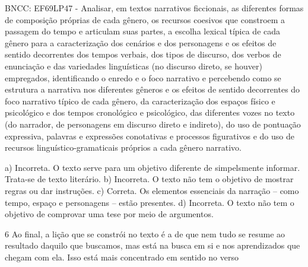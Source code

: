 \begin{escolha}
\begin{escolha}
\begin{escolha}
\begin{escolha}
\begin{escolha}
\begin{escolha}
BNCC: EF69LP47 - Analisar, em textos narrativos ficcionais, as
diferentes formas de composição próprias de cada gênero, os recursos
coesivos que constroem a passagem do tempo e articulam suas partes, a
escolha lexical típica de cada gênero para a caracterização dos cenários
e dos personagens e os efeitos de sentido decorrentes dos tempos
verbais, dos tipos de discurso, dos verbos de enunciação e das
variedades linguísticas (no discurso direto, se houver) empregados,
identificando o enredo e o foco narrativo e percebendo como se estrutura
a narrativa nos diferentes gêneros e os efeitos de sentido decorrentes
do foco narrativo típico de cada gênero, da caracterização dos espaços
físico e psicológico e dos tempos cronológico e psicológico, das
diferentes vozes no texto (do narrador, de personagens em discurso
direto e indireto), do uso de pontuação expressiva, palavras e
expressões conotativas e processos figurativos e do uso de recursos
linguístico-gramaticais próprios a cada gênero narrativo.

a) Incorreta. O texto serve para um objetivo diferente de simpelsmente
informar. Trata-se de texto literário. b) Incorreta. O texto não tem o
objetivo de mostrar regras ou dar instruções. c) Correta. Os elementos
essenciais da narração -- como tempo, espaço e personagens -- estão
presentes. d) Incorreta. O texto não tem o objetivo de comprovar uma
tese por meio de argumentos.

\num{6} Ao final, a lição que se constrói no texto é a de que nem tudo
se resume ao resultado daquilo que buscamos, mas está na busca em si e
nos aprendizados que chegam com ela. Isso está mais concentrado em
sentido no verso

\end{escolha}
\end{escolha}
\end{escolha}
\end{escolha}
\end{escolha}
\end{escolha}
